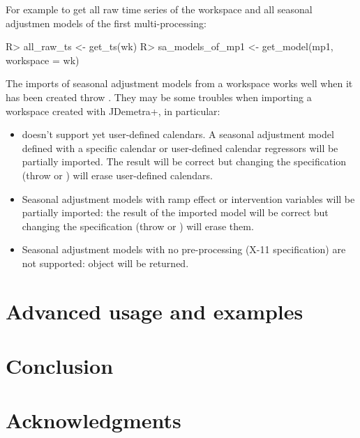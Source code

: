\documentclass[article]{jss}
\providecommand{\tightlist}{%
  \setlength{\itemsep}{0pt}\setlength{\parskip}{0pt}}
\begin{document}
For example to get all raw time series of the workspace and all seasonal
adjustmen models of the first multi-processing:

\begin{CodeChunk}

\begin{CodeInput}
R> all_raw_ts <- get_ts(wk)
R> sa_models_of_mp1 <- get_model(mp1, workspace = wk)
\end{CodeInput}
\end{CodeChunk}

The imports of seasonal adjustment models from a workspace works well
when it has been created throw . They may be some
troubles when importing a workspace created with JDemetra+, in
particular:

\begin{itemize}
\tightlist
\item
   doesn't support yet user-defined calendars. A seasonal
  adjustment model defined with a specific calendar or user-defined
  calendar regressors will be partially imported. The result will be
  correct but changing the specification (throw  or
  ) will erase user-defined calendars.\\
\item
  Seasonal adjustment models with ramp effect or intervention variables
  will be partially imported: the result of the imported model will be
  correct but changing the specification (throw  or
  ) will erase them.\\
\item
  Seasonal adjustment models with no pre-processing (X-11 specification)
  are not supported:  object will be returned.
\end{itemize}

\hypertarget{advanced-usage-and-examples}{%
\section{Advanced usage and
examples}\label{advanced-usage-and-examples}}

\hypertarget{conclusion}{%
\section{Conclusion}\label{conclusion}}

\hypertarget{acknowledgments}{%
\section*{Acknowledgments}\label{acknowledgments}}

\renewcommand\refname{References}

\end{document}
